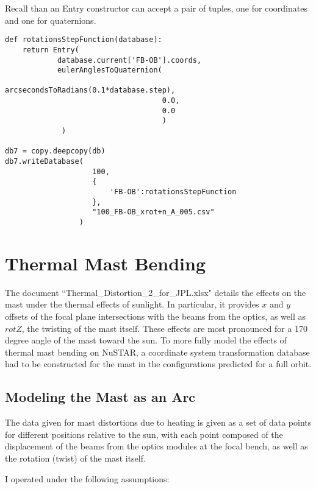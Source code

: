 Recall than an Entry constructor can accept a pair of tuples, one for 
coordinates and one for quaternions. 
\begin{verbatim}
def rotationsStepFunction(database):
    return Entry(
            database.current['FB-OB'].coords,
            eulerAnglesToQuaternion(
                                    arcsecondsToRadians(0.1*database.step),
                                    0.0,
                                    0.0
                                    )
             )

db7 = copy.deepcopy(db)
db7.writeDatabase(
                    100, 
                    {
                        'FB-OB':rotationsStepFunction
                    }, 
                    "100_FB-OB_xrot+n_A_005.csv"
                 )
\end{verbatim}

\section{Thermal Mast Bending}

The document ``Thermal\_Distortion\_2\_for\_JPL.xlsx" details the effects on the mast under the thermal effects of sunlight. In particular, it provides $x$ and $y$ offsets of the focal plane intersections with the beams from the optics, as well as $rotZ$, the twisting of the mast itself. These effects are most pronounced for a 170 degree angle of the mast toward the sun. To more fully model the effects of thermal mast bending on NuSTAR, a coordinate system transformation database had to be constructed for the mast in the configurations predicted for a full orbit. 


\subsection{Modeling the Mast as an Arc}

The data given for mast distortions due to heating is given as a set of data points for different positions relative to the sun, with each point composed of the displacement of the beams from the optics modules at the focal bench, as well as the rotation (twist) of the mast itself. 

I operated under the following assumptions:


